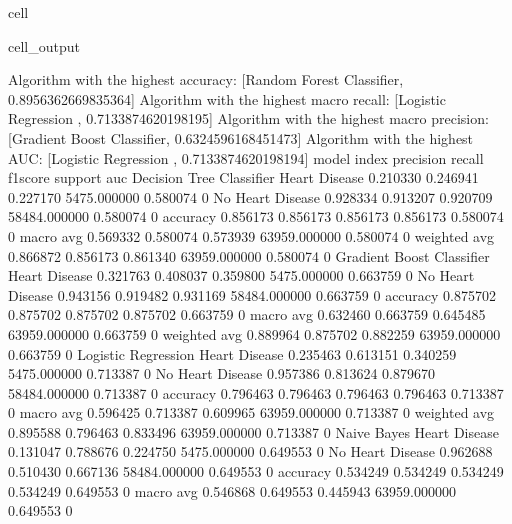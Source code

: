 \documentclass[letterpaper,10pt,english]{jupyterBook}
\begin{document}
\begin{sphinxuseclass}{cell}
\begin{sphinxVerbatimOutput}
\begin{sphinxuseclass}{cell_output}
\begin{sphinxVerbatim}[commandchars=\\\{\}]
Algorithm with the highest accuracy: [\PYGZsq{}Random Forest Classifier\PYGZsq{}, 0.8956362669835364]
Algorithm with the highest macro recall:
        [\PYGZsq{}Logistic Regression \PYGZsq{}, 0.7133874620198195]
Algorithm with the highest macro precision:
        [\PYGZsq{}Gradient Boost Classifier\PYGZsq{}, 0.6324596168451473]
Algorithm with the highest AUC:
        [\PYGZsq{}Logistic Regression \PYGZsq{}, 0.7133874620198194]
model                      index             precision  recall    f1\PYGZhy{}score  support       auc     
Decision Tree Classifier   Heart Disease     0.210330   0.246941  0.227170  5475.000000   0.580074    0
                           No Heart Disease  0.928334   0.913207  0.920709  58484.000000  0.580074    0
                           accuracy          0.856173   0.856173  0.856173  0.856173      0.580074    0
                           macro avg         0.569332   0.580074  0.573939  63959.000000  0.580074    0
                           weighted avg      0.866872   0.856173  0.861340  63959.000000  0.580074    0
Gradient Boost Classifier  Heart Disease     0.321763   0.408037  0.359800  5475.000000   0.663759    0
                           No Heart Disease  0.943156   0.919482  0.931169  58484.000000  0.663759    0
                           accuracy          0.875702   0.875702  0.875702  0.875702      0.663759    0
                           macro avg         0.632460   0.663759  0.645485  63959.000000  0.663759    0
                           weighted avg      0.889964   0.875702  0.882259  63959.000000  0.663759    0
Logistic Regression        Heart Disease     0.235463   0.613151  0.340259  5475.000000   0.713387    0
                           No Heart Disease  0.957386   0.813624  0.879670  58484.000000  0.713387    0
                           accuracy          0.796463   0.796463  0.796463  0.796463      0.713387    0
                           macro avg         0.596425   0.713387  0.609965  63959.000000  0.713387    0
                           weighted avg      0.895588   0.796463  0.833496  63959.000000  0.713387    0
Naive Bayes                Heart Disease     0.131047   0.788676  0.224750  5475.000000   0.649553    0
                           No Heart Disease  0.962688   0.510430  0.667136  58484.000000  0.649553    0
                           accuracy          0.534249   0.534249  0.534249  0.534249      0.649553    0
                           macro avg         0.546868   0.649553  0.445943  63959.000000  0.649553    0

\end{sphinxVerbatim}
\end{sphinxuseclass}
\end{sphinxVerbatimOutput}
\end{sphinxuseclass}
\end{document}
